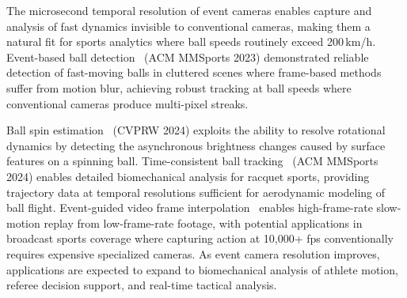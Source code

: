 The microsecond temporal resolution of event cameras enables capture and analysis of fast dynamics invisible to conventional cameras, making them a natural fit for sports analytics where ball speeds routinely exceed 200\,km/h. Event-based ball detection~\cite{delamare2023balldetect} (ACM MMSports 2023) demonstrated reliable detection of fast-moving balls in cluttered scenes where frame-based methods suffer from motion blur, achieving robust tracking at ball speeds where conventional cameras produce multi-pixel streaks.

Ball spin estimation~\cite{gao2024ballspin} (CVPRW 2024) exploits the ability to resolve rotational dynamics by detecting the asynchronous brightness changes caused by surface features on a spinning ball. Time-consistent ball tracking~\cite{gao2024balltracking} (ACM MMSports 2024) enables detailed biomechanical analysis for racquet sports, providing trajectory data at temporal resolutions sufficient for aerodynamic modeling of ball flight. Event-guided video frame interpolation~\cite{tulyakov2021timelens} enables high-frame-rate slow-motion replay from low-frame-rate footage, with potential applications in broadcast sports coverage where capturing action at 10{,}000+ fps conventionally requires expensive specialized cameras. As event camera resolution improves, applications are expected to expand to biomechanical analysis of athlete motion, referee decision support, and real-time tactical analysis.
